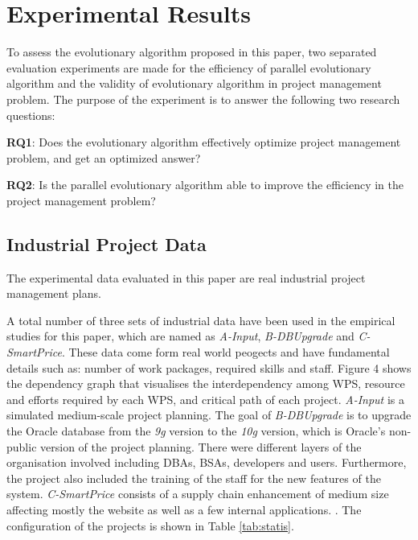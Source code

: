 %
%
\newcommand{\projectA}[0]{\emph{A-Input}}
\newcommand{\projectB}[0]{\emph{B-DBUpgrade}}
\newcommand{\projectC}[0]{\emph{C-SmartPrice}}

\section{Experimental Results}
%
To assess the evolutionary algorithm proposed in this paper, two separated
evaluation experiments are made for the efficiency of parallel evolutionary
algorithm and the validity of evolutionary algorithm in project management
problem. The purpose of the experiment is to answer the following two research
questions:


\textbf{RQ1}: Does the evolutionary algorithm effectively optimize project
management problem, and get an optimized answer?

\textbf{RQ2}: Is the parallel evolutionary algorithm able to improve the
efficiency in the project management problem?


\subsection{Industrial Project Data}
%
The experimental data evaluated in this paper are real industrial project
management plans.


A total number of three sets of industrial data have been used in the empirical
studies for this paper, which are named as \projectA{}, \projectB{} and
\projectC{}. These data come form real world peogects and have fundamental
details such as: number of work packages, required skills and staff.  Figure 4
shows the dependency graph that visualises the interdependency among WPS,
resource and efforts required by each WPS, and critical path of each
project. \projectA{} is a simulated medium-scale project planning. The goal of
\projectB{} is to upgrade the Oracle database from the \emph{9g} version to the
\emph{10g} version, which is Oracle's non-public version of the project
planning. There were different layers of the organisation involved including
DBAs, BSAs, developers and users.  Furthermore, the project also included the
training of the staff for the new features of the system.  \projectC{} consists
of a supply chain enhancement of medium size affecting mostly the website as
well as a few internal applications. \cite{ren}.  The configuration of the
projects is shown in Table \ref{tab:statis}.

